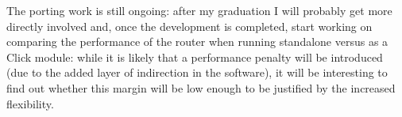 \documentclass[11pt,a4paper,twoside,titlepage,openany]{book}
\makeatletter
\newcommand{\specialcell}[2][c]{%
  \begin{tabular}[#1]{@{}c@{}}#2\end{tabular}}
\makeatother
\begin{document}
The porting work is still ongoing: after my graduation I will probably get more directly involved and, once the development is completed, start working on comparing the performance of the router when running standalone versus as a Click module: while it is likely that a performance penalty will be introduced (due to the added layer of indirection in the software), it will be interesting to find out whether this margin will be low enough to be justified by the increased flexibility.

\end{document}
